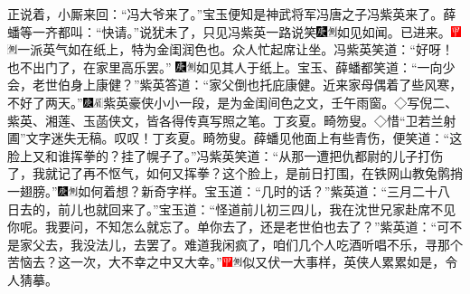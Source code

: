 正说着，小厮来回：``冯大爷来了。''宝玉便知是神武将军冯唐之子冯紫英来了。薛蟠等一齐都叫：``快请。''说犹未了，只见冯紫英一路说笑{\includegraphics[width=3mm]{../Images/00004}\includegraphics[width=3mm]{../Images/00011}\footnotesize \kaishu 如见如闻。}已进来。{\includegraphics[width=3mm]{../Images/00002}\includegraphics[width=3mm]{../Images/00011}\footnotesize \kaishu 一派英气如在纸上，特为金闺润色也。}众人忙起席让坐。冯紫英笑道：``好呀！也不出门了，在家里高乐罢。''
{\includegraphics[width=3mm]{../Images/00004}\includegraphics[width=3mm]{../Images/00011}\footnotesize \kaishu 如见其人于纸上。}宝玉、薛蟠都笑道：``一向少会，老世伯身上康健？''紫英答道：``家父倒也托庇康健。近来家母偶着了些风寒，不好了两天。''{{\includegraphics[width=3mm]{../Images/00004}\includegraphics[width=3mm]{../Images/00010}\footnotesize \kaishu 紫英豪侠小小一段，是为金闺间色之文，壬午雨窗。}◇写倪二、紫英、湘莲、玉菡侠文，皆各得传真写照之笔。丁亥夏。畸笏叟。◇惜``卫若兰射圃''文字迷失无稿。叹叹！丁亥夏。畸笏叟。}薛蟠见他面上有些青伤，便笑道：``这脸上又和谁挥拳的？挂了幌子了。''冯紫英笑道：``从那一遭把仇都尉的儿子打伤了，我就记了再不怄气，如何又挥拳？这个脸上，是前日打围，在铁网山教兔鹘捎一翅膀。''{\includegraphics[width=3mm]{../Images/00004}\includegraphics[width=3mm]{../Images/00011}\footnotesize \kaishu 如何着想？新奇字样。}宝玉道：``几时的话？''紫英道：``三月二十八日去的，前儿也就回来了。''宝玉道：``怪道前儿初三四儿，我在沈世兄家赴席不见你呢。我要问，不知怎么就忘了。单你去了，还是老世伯也去了？''紫英道：``可不是家父去，我没法儿，去罢了。难道我闲疯了，咱们几个人吃酒听唱不乐，寻那个苦恼去？这一次，大不幸之中又大幸。''{\includegraphics[width=3mm]{../Images/00002}\includegraphics[width=3mm]{../Images/00011}\footnotesize \kaishu 似又伏一大事样，英侠人累累如是，令人猜摹。}

